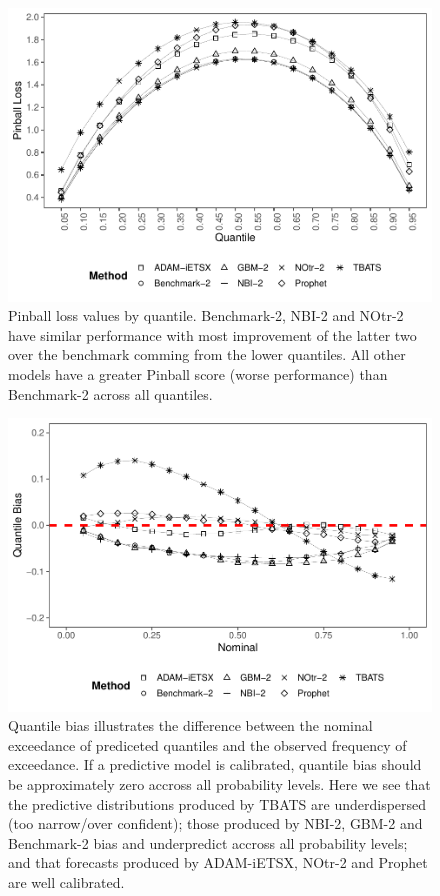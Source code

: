 \documentclass[]{elsarticle} %
\begin{document}
\begin{figure}[H]

{\centering \includegraphics[width=0.7\linewidth]{paper_files/figure-latex/Pinball-1} 

}

\caption{Pinball loss values by quantile. Benchmark-2, NBI-2 and NOtr-2 have similar performance with most improvement of the latter two over the benchmark comming from the lower quantiles. All other models have a greater Pinball score (worse performance) than Benchmark-2 across all quantiles.}\label{fig:Pinball}
\end{figure}

\begin{figure}[H]

{\centering \includegraphics[width=0.7\linewidth]{paper_files/figure-latex/quantile-bias-1} 

}

\caption{Quantile bias illustrates the difference between the nominal exceedance of prediceted quantiles and the observed frequency of exceedance. If a predictive model is calibrated, quantile bias should be approximately zero accross all probability levels. Here we see that the predictive distributions produced by TBATS are underdispersed (too narrow/over confident); those produced by NBI-2, GBM-2 and Benchmark-2 bias and underpredict accross all probability levels; and that forecasts produced by ADAM-iETSX, NOtr-2 and Prophet are well calibrated.}\label{fig:quantile-bias}
\end{figure}
\end{document}
